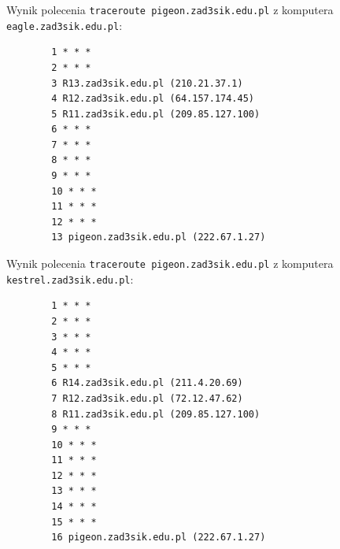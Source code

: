 \documentclass[12pt]{article}
\begin{document}
	\medskip
	
	Wynik polecenia \texttt{traceroute pigeon.zad3sik.edu.pl} z komputera
	\texttt{eagle.zad3sik.edu.pl}:
	\begin{verbatim}
		1 * * *
		2 * * *
		3 R13.zad3sik.edu.pl (210.21.37.1)
		4 R12.zad3sik.edu.pl (64.157.174.45)
		5 R11.zad3sik.edu.pl (209.85.127.100)
		6 * * *
		7 * * *
		8 * * *
		9 * * *
		10 * * *
		11 * * *
		12 * * *
		13 pigeon.zad3sik.edu.pl (222.67.1.27)
	\end{verbatim}
	
	\medskip
	
	Wynik polecenia \texttt{traceroute pigeon.zad3sik.edu.pl} z komputera
	\texttt{kestrel.zad3sik.edu.pl}:
	\begin{verbatim}
		1 * * *
		2 * * *
		3 * * *
		4 * * *
		5 * * *
		6 R14.zad3sik.edu.pl (211.4.20.69)
		7 R12.zad3sik.edu.pl (72.12.47.62)
		8 R11.zad3sik.edu.pl (209.85.127.100)
		9 * * *
		10 * * *
		11 * * *
		12 * * *
		13 * * *
		14 * * *
		15 * * *
		16 pigeon.zad3sik.edu.pl (222.67.1.27)
	\end{verbatim}
\end{document}
